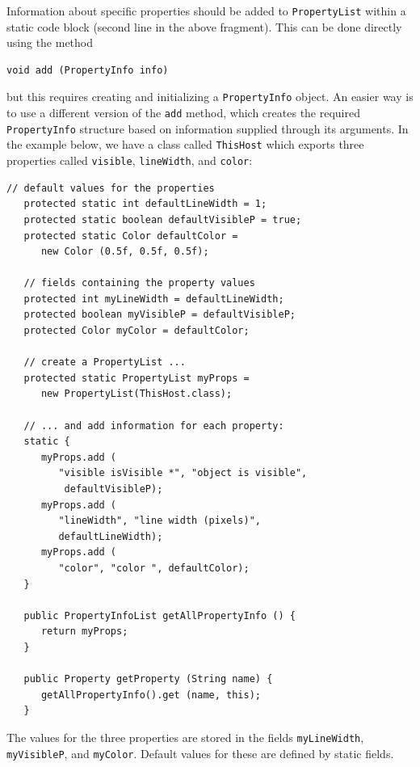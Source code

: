 \documentclass{article}
\begin{document}
Information about specific properties should be added to {\tt PropertyList} 
within a static code block (second line in the above
fragment). This can be done directly using the method
\begin{lstlisting}[]
   void add (PropertyInfo info)
\end{lstlisting}
but this requires creating and initializing a {\tt PropertyInfo}
object. An easier way is to use a different version of the {\tt add}
method, which creates the required {\tt PropertyInfo} 
structure based on information supplied through its
arguments.  In the example below, we have a class
called {\tt ThisHost} which exports three properties called {\tt visible}, 
{\tt lineWidth}, and {\tt color}:

\begin{lstlisting}[]
   // default values for the properties
   protected static int defaultLineWidth = 1;
   protected static boolean defaultVisibleP = true;
   protected static Color defaultColor = 
      new Color (0.5f, 0.5f, 0.5f);

   // fields containing the property values
   protected int myLineWidth = defaultLineWidth;
   protected boolean myVisibleP = defaultVisibleP;
   protected Color myColor = defaultColor;

   // create a PropertyList ...
   protected static PropertyList myProps = 
      new PropertyList(ThisHost.class);

   // ... and add information for each property:
   static {
      myProps.add (
         "visible isVisible *", "object is visible", 
          defaultVisibleP);
      myProps.add (
         "lineWidth", "line width (pixels)", 
         defaultLineWidth);
      myProps.add (
         "color", "color ", defaultColor);
   }

   public PropertyInfoList getAllPropertyInfo () {
      return myProps;
   }

   public Property getProperty (String name) {
      getAllPropertyInfo().get (name, this);
   }
\end{lstlisting}
The values for the three properties are stored in the fields {\tt myLineWidth}, 
{\tt myVisibleP}, and {\tt myColor}. Default values for
these are defined by static fields.
\end{document}
